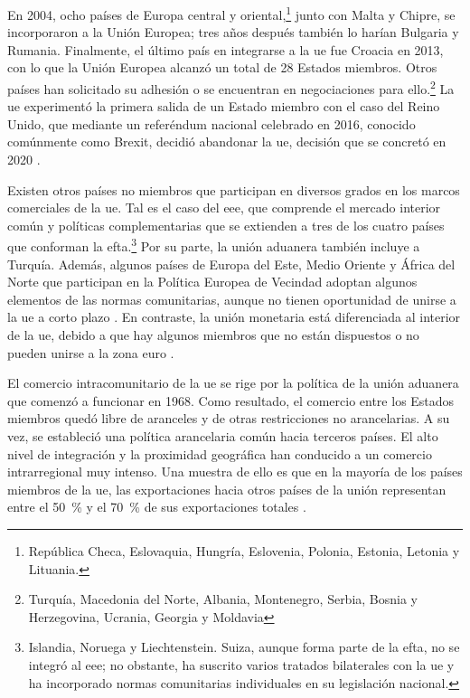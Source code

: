 En 2004, ocho países de Europa central y oriental,\footnote{República Checa, Eslovaquia, Hungría, Eslovenia, Polonia, Estonia, Letonia y Lituania.} junto con Malta y Chipre, se incorporaron a la Unión Europea; tres años después también lo harían Bulgaria y Rumania. Finalmente, el último país en integrarse a la \gls{ue} fue Croacia en 2013, con lo que la Unión Europea alcanzó un total de 28 Estados miembros. Otros países han solicitado su adhesión o se encuentran en negociaciones para ello.\footnote{Turquía, Macedonia del Norte, Albania, Montenegro, Serbia, Bosnia y Herzegovina, Ucrania, Georgia y Moldavia} La \gls{ue} experimentó la primera salida de un Estado miembro con el caso del Reino Unido, que mediante un referéndum nacional celebrado en 2016, conocido comúnmente como Brexit, decidió abandonar la \acrlong{ue}, decisión que se concretó en 2020 \parencite[pp.~564--565]{EuropaDirectory2022}. 

Existen otros países no miembros que participan en diversos grados en los marcos comerciales de la \gls{ue}. Tal es el caso del \gls{eee}, que comprende el mercado interior común y políticas complementarias que se extienden a tres de los cuatro países que conforman la \gls{efta}.\footnote{Islandia, Noruega y Liechtenstein. Suiza, aunque forma parte de la \gls{efta}, no se integró al \gls{eee}; no obstante, ha suscrito varios tratados bilaterales con la \gls{ue} y ha incorporado normas comunitarias individuales en su legislación nacional.} Por su parte, la unión aduanera también incluye a Turquía. Además, algunos países de Europa del Este, Medio Oriente y África del Norte que participan en la Política Europea de Vecindad adoptan algunos elementos de las normas comunitarias, aunque no tienen oportunidad de unirse a la \gls{ue} a corto plazo \parencite[p.~4]{Leuffen2022}. En contraste, la unión monetaria está diferenciada al interior de la \gls{ue}, debido a que hay algunos miembros que no están dispuestos o no pueden unirse a la zona euro \parencite[p.~381]{Leuffen2022}. 

El comercio intracomunitario de la \gls{ue} se rige por la política de la unión aduanera que comenzó a funcionar en 1968. Como resultado, el comercio entre los Estados miembros quedó libre de aranceles y de otras restricciones no arancelarias. A su vez, se estableció una política arancelaria común hacia terceros países. El alto nivel de integración y la proximidad geográfica han conducido a un comercio intrarregional muy intenso. Una muestra de ello es que en la mayoría de los países miembros de la \gls{ue}, las exportaciones hacia otros países de la unión representan entre el 50~\% y el 70~\% de sus exportaciones totales \parencite[pp.~51--52]{Kollarik2025}.

